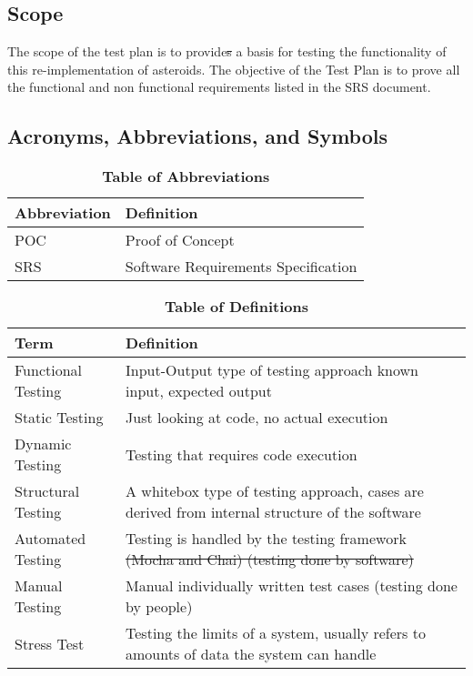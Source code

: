 \documentclass[12pt, titlepage]{article}
\begin{document}
\subsection{Scope}
The scope of the test plan is to provide\sout{s} a basis for testing the functionality of this re-implementation of asteroids. The objective of the Test Plan is to prove all the functional and non functional requirements listed in the SRS document.

\subsection{Acronyms, Abbreviations, and Symbols}

\begin{table}[hbp]
\caption{\textbf{Table of Abbreviations}} \label{Table}

\begin{tabularx}{\textwidth}{p{3cm}X}
\toprule
\textbf{Abbreviation} & \textbf{Definition} \\
\midrule
POC & Proof of Concept\\
SRS & Software Requirements Specification\\
\bottomrule
\end{tabularx}

\end{table}

\begin{table}[!htbp]
\caption{\textbf{Table of Definitions}} \label{Table}

\begin{tabularx}{\textwidth}{p{3cm}X}
\toprule
\textbf{Term} & \textbf{Definition}\\
\midrule
Functional Testing & Input-Output type of testing approach known input, expected output\\
Static Testing & Just looking at code, no actual execution\\
Dynamic Testing & Testing that requires code execution\\
Structural Testing & A whitebox type of testing approach, cases are derived from internal structure of the software\\
Automated Testing & Testing is handled by the testing framework \sout{(Mocha and Chai) (testing done by software)}\\
Manual Testing & Manual individually written test cases (testing done by people)\\
Stress Test & Testing the limits of a system, usually refers to amounts of data the system can handle\\
\bottomrule
\end{tabularx}

\end{table}
\end{document}
